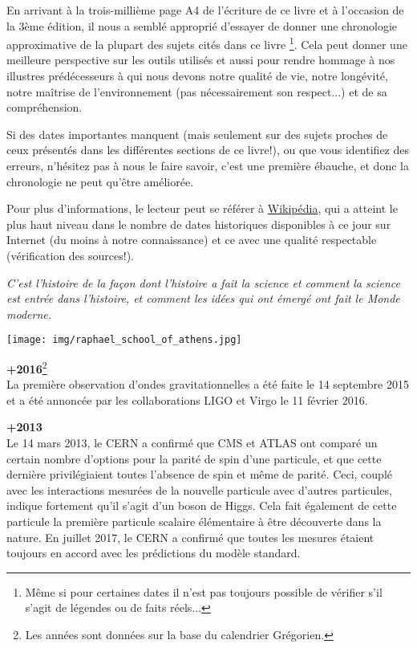 En arrivant à la trois-millième page A4 de l'écriture de ce livre et à l'occasion de la 3ème édition, il nous a semblé approprié d'essayer de donner une chronologie approximative de la plupart des sujets cités dans ce livre \footnote{Même si pour certaines dates il n'est pas toujours possible de vérifier s'il s'agit de légendes ou de faits réels...}. Cela peut donner une meilleure perspective sur les outils utilisés et aussi pour rendre hommage à nos illustres prédécesseurs à qui nous devons notre qualité de vie, notre longévité, notre maîtrise de l'environnement (pas nécessairement son respect...) et de sa compréhension.

Si des dates importantes manquent (mais seulement sur des sujets proches de ceux présentés dans les différentes sections de ce livre!), ou que vous identifiez des erreurs, n'hésitez pas à nous le faire savoir, c'est une première ébauche, et donc la chronologie ne peut qu'être améliorée.

Pour plus d'informations, le lecteur peut se référer à \href{http://www.wikipedia.com}{{\color{blue} Wikipédia}}, qui a atteint le plus haut niveau dans le nombre de dates historiques disponibles à ce jour sur Internet (du moins à notre connaissance) et ce avec une qualité respectable (vérification des sources!).

\begin{center}
\textit{C'est l'histoire de la façon dont l'histoire a fait la science et comment la science est entrée dans l'histoire, et comment les idées qui ont émergé ont fait le Monde moderne.}
\end{center}

\texttt{[image: img/raphael\_school\_of\_athens.jpg]}

\textbf{+2016}\footnote{Les années sont données sur la base du calendrier Grégorien.}\\
La première observation d'ondes gravitationnelles a été faite le 14 septembre 2015 et a été annoncée par les collaborations LIGO et Virgo le 11 février 2016.

\textbf{+2013}\\
Le 14 mars 2013, le CERN a confirmé que CMS et ATLAS ont comparé un certain nombre d'options pour la parité de spin d'une particule, et que cette dernière privilégiaient toutes l'absence de spin et même de parité. Ceci, couplé avec les interactions mesurées de la nouvelle particule avec d'autres particules, indique fortement qu'il s'agit d'un boson de Higgs. Cela fait également de cette particule la première particule scalaire élémentaire à être découverte dans la nature. En juillet 2017, le CERN a confirmé que toutes les mesures étaient toujours en accord avec les prédictions du modèle standard.

